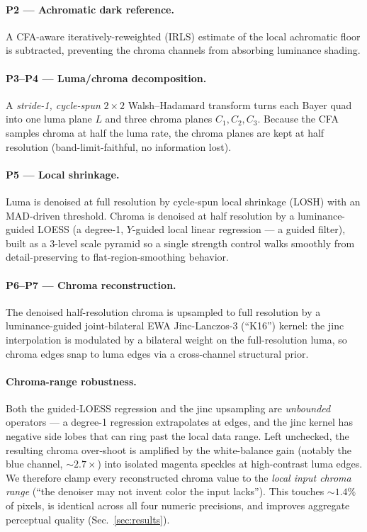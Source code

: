 \documentclass[10pt,twocolumn]{article}
\begin{document}
\paragraph{P2 --- Achromatic dark reference.}
A CFA-aware iteratively-reweighted (IRLS) estimate of the local achromatic floor
is subtracted, preventing the chroma channels from absorbing luminance shading.

\paragraph{P3--P4 --- Luma/chroma decomposition.}
A \emph{stride-1, cycle-spun} $2{\times}2$ Walsh--Hadamard transform turns each
Bayer quad into one luma plane $L$ and three chroma planes $C_1,C_2,C_3$. Because
the CFA samples chroma at half the luma rate, the chroma planes are kept at
half resolution (band-limit-faithful, no information lost).

\paragraph{P5 --- Local shrinkage.}
Luma is denoised at full resolution by cycle-spun local shrinkage (LOSH) with an
MAD-driven threshold. Chroma is denoised at half resolution by a luminance-guided
LOESS (a degree-1, $Y$-guided local linear regression --- a guided filter), built
as a 3-level scale pyramid so a single strength control walks smoothly from
detail-preserving to flat-region-smoothing behavior.

\paragraph{P6--P7 --- Chroma reconstruction.}
The denoised half-resolution chroma is upsampled to full resolution by a
luminance-guided joint-bilateral EWA Jinc-Lanczos-3 (``K16'') kernel: the jinc
interpolation is modulated by a bilateral weight on the full-resolution luma, so
chroma edges snap to luma edges via a cross-channel structural prior.

\paragraph{Chroma-range robustness.}
Both the guided-LOESS regression and the jinc upsampling are \emph{unbounded}
operators --- a degree-1 regression extrapolates at edges, and the jinc kernel
has negative side lobes that can ring past the local data range. Left unchecked,
the resulting chroma over-shoot is amplified by the white-balance gain (notably
the blue channel, $\sim\!2.7\times$) into isolated magenta speckles at high-contrast
luma edges. We therefore clamp every reconstructed chroma value to the
\emph{local input chroma range} (``the denoiser may not invent color the input
lacks''). This touches $\sim\!1.4\%$ of pixels, is identical across all four
numeric precisions, and improves aggregate perceptual quality (Sec.~\ref{sec:results}).
\end{document}
